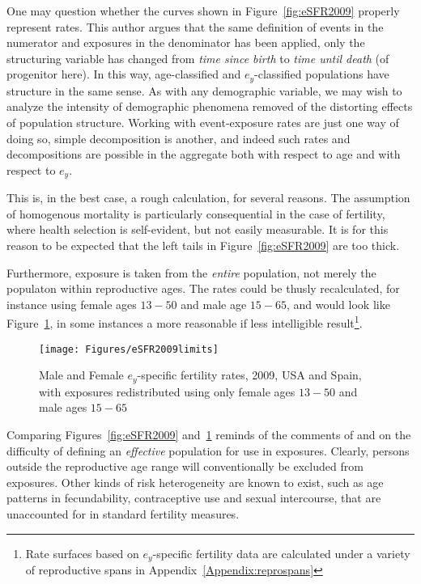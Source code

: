 One may question whether the curves shown in Figure~\ref{fig:eSFR2009} properly
represent rates. This author argues that the same definition of events in the
numerator and exposures in the denominator has been applied, only the
structuring variable has changed from \textit{time since birth} to \textit{time
until death} (of progenitor here). In this way, age-classified and
$e_y$-classified populations have structure in the same sense. As with any
demographic variable, we may wish to analyze the intensity of demographic
phenomena removed of the distorting effects of population structure.
Working with event-exposure rates are just one way of doing so, simple
decomposition is another, and indeed such rates and decompositions are possible
in the aggregate both with respect to age and with respect to
$e_y$.

This is, in the best case, a rough calculation, for several reasons. The
assumption of homogenous mortality is particularly consequential in the case of 
fertility, where health selection is self-evident, but not easily measurable.
It is for this reason to be expected that the left tails in
Figure~\ref{fig:eSFR2009} are too thick. 

Furthermore, exposure is taken from the \textit{entire} population, not merely
the populaton within reproductive ages. The rates could be thusly recalculated,
for instance using female ages $13-50$ and male age $15-65$, and would look like 
Figure~\ref{fig:eSFR2009limits}, in some instances a more reasonable if less
intelligible result\footnote{Rate surfaces based on $e_y$-specific fertility
data are calculated under a variety of reproductive spans in
Appendix~\ref{Appendix:reprospans}}.

\begin{figure}[ht!]
        \centering  
          \caption{Male and Female $e_y$-specific fertility rates, 2009, USA and
          Spain, with exposures redistributed using only female ages $13-50$ and
          male ages $15-65$}
          \texttt{[image: Figures/eSFR2009limits]}
          \label{fig:eSFR2009limits}
\end{figure}

Comparing Figures~\ref{fig:eSFR2009} and~\ref{fig:eSFR2009limits} reminds of the
comments of \citet{gupta1978alternative} and \citet{mitra1976effect} on the difficulty of
defining an \textit{effective} population for use in exposures. Clearly, persons
outside the reproductive age range will conventionally be excluded from
exposures. Other kinds of risk heterogeneity are known to exist, such as age
patterns in fecundability, contraceptive use and sexual intercourse, that are
unaccounted for in standard fertility measures. 

